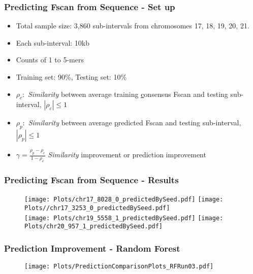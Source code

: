 \documentclass[10pt,dvipsnames,table]{beamer}
\begin{document}
\begin{frame}
\frametitle{Predicting Fscan from Sequence - Set up}
\begin{itemize}
\item Total sample size: 3,860 sub-intervals from chromosomes 17, 18, 19, 20, 21.
\item Each sub-interval: 10kb
\item Counts of 1 to 5-mers
\item Training set: 90\%, Testing set: 10\%
\pause
\item $\rho_{c}:$ {\emph{Similarity}} between average training {\underline{c}}onsensus Fscan and testing sub-interval, $|\rho_{c}| \leq 1$
\item $\rho_{p}:$ {\emph{Similarity}} between average {\underline{p}}redicted Fscan and testing sub-interval, $|\rho_{p}| \leq 1$
\item $\gamma = \frac{\rho_{p} - \rho_{c}}{1 - \rho_{c}} $ {\emph{Similarity}} improvement or prediction improvement
\end{itemize}
\end{frame}

\begin{frame}
\frametitle{Predicting Fscan from Sequence - Results}
\vspace{-0.5cm}
\begin{figure}
\texttt{[image: Plots/chr17\_8028\_0\_predictedBySeed.pdf]}
\pause
\hspace{0.5cm}
\texttt{[image: Plots//chr17\_3253\_0\_predictedBySeed.pdf]} \\
\pause
\texttt{[image: Plots/chr19\_5558\_1\_predictedBySeed.pdf]}
\hspace{0.5cm}
\pause
\texttt{[image: Plots/chr20\_957\_1\_predictedBySeed.pdf]}
\end{figure}
\end{frame}

\begin{frame}
\frametitle{Prediction Improvement - Random Forest}
\vspace{-0.5cm}
\begin{figure}
\texttt{[image: Plots/PredictionComparisonPlots\_RFRun03.pdf]}
\end{figure}
\end{frame}
\end{document}
